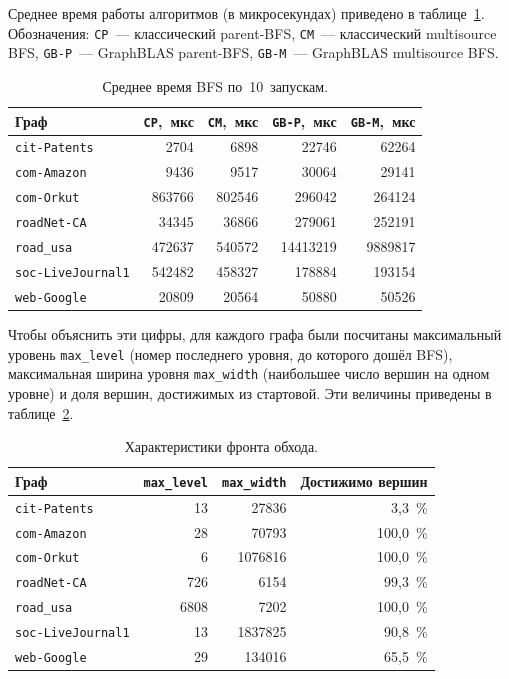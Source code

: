 \documentclass[a4paper]{article}
\begin{document}
Среднее время работы алгоритмов (в микросекундах) приведено в таблице~\ref{tab:results}. Обозначения: \texttt{CP}~--- классический parent-BFS, \texttt{CM}~--- классический multisource BFS, \texttt{GB-P}~--- GraphBLAS parent-BFS, \texttt{GB-M}~--- GraphBLAS multisource BFS.

\begin{table}[h!]
\centering
\scriptsize
\setlength{\tabcolsep}{4pt}
\begin{tabular}{lrrrr}
\toprule
Граф & \texttt{CP},~мкс & \texttt{CM},~мкс & \texttt{GB-P},~мкс & \texttt{GB-M},~мкс \\
\midrule
\texttt{cit-Patents}      & 2704    & 6898    & 22746    & 62264    \\
\texttt{com-Amazon}       & 9436    & 9517    & 30064    & 29141    \\
\texttt{com-Orkut}        & 863766  & 802546  & 296042   & 264124   \\
\texttt{roadNet-CA}       & 34345   & 36866   & 279061   & 252191   \\
\texttt{road\_usa}        & 472637  & 540572  & 14413219 & 9889817  \\
\texttt{soc-LiveJournal1} & 542482  & 458327  & 178884   & 193154   \\
\texttt{web-Google}       & 20809   & 20564   & 50880    & 50526    \\
\bottomrule
\end{tabular}
\caption{Среднее время BFS по~10~запускам.}
\label{tab:results}
\end{table}

Чтобы объяснить эти цифры, для каждого графа были посчитаны максимальный уровень \texttt{max\_level} (номер последнего уровня, до которого дошёл BFS), максимальная ширина уровня \texttt{max\_width} (наибольшее число вершин на одном уровне) и доля вершин, достижимых из стартовой. Эти величины приведены в таблице~\ref{tab:topology}.

\begin{table}[h!]
\centering
\scriptsize
\setlength{\tabcolsep}{6pt}
\begin{tabular}{lrrr}
\toprule
Граф & \texttt{max\_level} & \texttt{max\_width} & Достижимо вершин \\
\midrule
\texttt{cit-Patents}      & 13   & 27836   & 3,3~{\%}   \\
\texttt{com-Amazon}       & 28   & 70793   & 100,0~{\%} \\
\texttt{com-Orkut}        & 6    & 1076816 & 100,0~{\%} \\
\texttt{roadNet-CA}       & 726  & 6154    & 99,3~{\%}  \\
\texttt{road\_usa}        & 6808 & 7202    & 100,0~{\%} \\
\texttt{soc-LiveJournal1} & 13   & 1837825 & 90,8~{\%}  \\
\texttt{web-Google}       & 29   & 134016  & 65,5~{\%}  \\
\bottomrule
\end{tabular}
\caption{Характеристики фронта обхода.}
\label{tab:topology}
\end{table}
\end{document}
